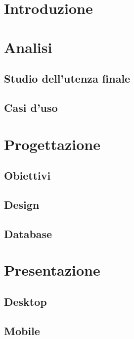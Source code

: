 \documentclass[a4paper, dvipsnames, table]{article}
\begin{document}
\copertina{}

\newpage
	\tableofcontents

\newpage
\section{Introduzione}
	
	
\newpage
\section{Analisi}
	\subsection{Studio dell'utenza finale}
		
	\subsection{Casi d'uso}
		

\newpage
\section{Progettazione}
	\subsection{Obiettivi}
		
	\subsection{Design}
		
	\subsection{Database}
		

\newpage
\section{Presentazione}
	\subsection{Desktop}
		
	\subsection{Mobile}
		
\end{document}
